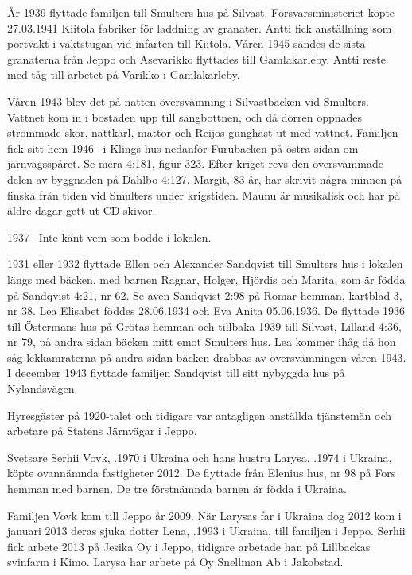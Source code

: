 År 1939 flyttade familjen till Smulters hus på Silvast. Försvarsministeriet köpte 27.03.1941 Kiitola fabriker för laddning av	granater. Antti fick anställning som portvakt i vaktstugan vid infarten till	Kiitola. Våren 1945 sändes de sista granaterna från Jeppo och	Asevarikko flyttades till Gamlakarleby. Antti reste med tåg till arbetet på Varikko i 	Gamlakarleby.

Våren 1943 blev det på natten översvämning i Silvastbäcken vid Smulters. Vattnet kom in i bostaden upp till sängbottnen, och då dörren öppnades strömmade skor, nattkärl, mattor och Reijos gunghäst ut med vattnet. Familjen fick sitt hem 1946-- i Klings hus nedanför Furubacken på östra sidan om 	järnvägsspåret. Se mera 4:181, figur 323. Efter kriget revs den översvämmade delen av byggnaden på Dahlbo 4:127. Margit, 83 år, har	skrivit några minnen på finska från tiden vid Smulters under krigstiden. Maunu är musikalisk och har på äldre dagar gett ut CD-skivor.

1937-- Inte känt vem som bodde i lokalen.

1931 eller 1932 flyttade Ellen och Alexander Sandqvist till Smulters	hus i lokalen längs med bäcken, med barnen Ragnar, Holger, Hjördis	och Marita, som är födda på Sandqvist 4:21, nr 62. Se även Sandqvist	2:98 på Romar hemman, kartblad 3, nr 38. Lea Elisabet föddes 28.06.1934 och Eva Anita 05.06.1936. De flyttade 1936 till Östermans hus på Grötas hemman och	tillbaka 1939 till Silvast, Lilland 4:36, nr 79, på andra sidan bäcken mitt emot Smulters hus. Lea kommer ihåg då hon såg lekkamraterna på andra sidan bäcken drabbas av översvämningen våren 1943. I december 1943 flyttade familjen Sandqvist till sitt nybyggda hus på Nylandsvägen.

Hyresgäster på 1920-talet och tidigare var antagligen anställda tjänstemän och arbetare på Statens Järnvägar i Jeppo.





Svetsare Serhii Vovk, .1970 i Ukraina och hans hustru Larysa, .1974 i Ukraina, köpte ovannämnda fastigheter 2012. De flyttade från Elenius hus, nr 98 på Fors hemman med barnen.	De tre förstnämnda barnen är födda i Ukraina.
\begin{jhchildren}
  \item {}
  \item {}
  \item {}
  \item {}
\end{jhchildren}
Familjen Vovk kom  till Jeppo år 2009. När Larysas far i Ukraina dog 	2012 kom i januari 2013 deras sjuka dotter Lena,  .1993 i Ukraina, till familjen i Jeppo. Serhii fick arbete 2013 på Jesika Oy i Jeppo, tidigare arbetade han på 	Lillbackas svinfarm i Kimo. Larysa har arbete på Oy Snellman Ab i	Jakobstad.

